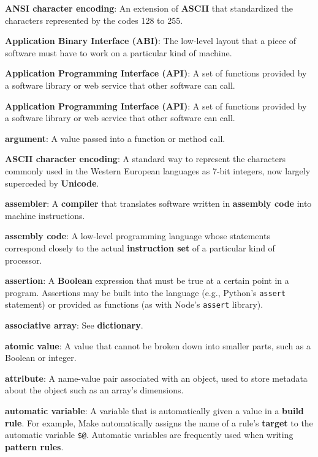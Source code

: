 \documentclass{scrbook}
\newcommand{\glosskey}[1]{\textbf{#1}}
\begin{document}
\noindent \textbf{\glosskey{ANSI character encoding}}: 
An extension of \glosskey{ASCII} that standardized the characters represented by the codes 128 to 255.


\noindent \textbf{\glosskey{Application Binary Interface} (ABI)}: 
The low-level layout that a piece of software must have to work on a particular kind of machine.


\noindent \textbf{\glosskey{Application Programming Interface} (API)}: 
A set of functions provided by a software library or web service that other software can call.


\noindent \textbf{\glosskey{Application Programming Interface} (API)}: 
A set of functions provided by a software library or web service that other software can call.


\noindent \textbf{\glosskey{argument}}: 
A value passed into a function or method call.


\noindent \textbf{\glosskey{ASCII character encoding}}: 
A standard way to represent the characters commonly used in the Western European languages as 7-bit integers, now largely superceded by \glosskey{Unicode}.


\noindent \textbf{\glosskey{assembler}}: 
A \glosskey{compiler} that translates software written in \glosskey{assembly code} into machine instructions.


\noindent \textbf{\glosskey{assembly code}}: 
A low-level programming language whose statements correspond closely to the actual \glosskey{instruction set} of a particular kind of processor.


\noindent \textbf{\glosskey{assertion}}: 
A \glosskey{Boolean} expression that must be true at a certain point in a program. Assertions may be built into the language (e.g., Python's \texttt{assert} statement) or provided as functions (as with Node's \texttt{assert} library).


\noindent \textbf{\glosskey{associative array}}: 
See \glosskey{dictionary}.


\noindent \textbf{\glosskey{atomic value}}: 
A value that cannot be broken down into smaller parts, such as a Boolean or integer.


\noindent \textbf{\glosskey{attribute}}: 
A name-value pair associated with an object, used to store metadata about the object such as an array's dimensions.


\noindent \textbf{\glosskey{automatic variable}}: 
A variable that is automatically given a value in a \glosskey{build rule}. For example, Make automatically assigns the name of a rule's \glosskey{target} to the automatic variable \texttt{\$@}. Automatic variables are frequently used when writing \glosskey{pattern rules}.
\end{document}
